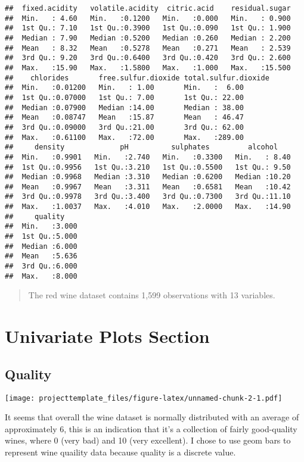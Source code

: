 \documentclass[]{article}
\begin{document}
\begin{verbatim}
##  fixed.acidity   volatile.acidity  citric.acid    residual.sugar  
##  Min.   : 4.60   Min.   :0.1200   Min.   :0.000   Min.   : 0.900  
##  1st Qu.: 7.10   1st Qu.:0.3900   1st Qu.:0.090   1st Qu.: 1.900  
##  Median : 7.90   Median :0.5200   Median :0.260   Median : 2.200  
##  Mean   : 8.32   Mean   :0.5278   Mean   :0.271   Mean   : 2.539  
##  3rd Qu.: 9.20   3rd Qu.:0.6400   3rd Qu.:0.420   3rd Qu.: 2.600  
##  Max.   :15.90   Max.   :1.5800   Max.   :1.000   Max.   :15.500  
##    chlorides       free.sulfur.dioxide total.sulfur.dioxide
##  Min.   :0.01200   Min.   : 1.00       Min.   :  6.00      
##  1st Qu.:0.07000   1st Qu.: 7.00       1st Qu.: 22.00      
##  Median :0.07900   Median :14.00       Median : 38.00      
##  Mean   :0.08747   Mean   :15.87       Mean   : 46.47      
##  3rd Qu.:0.09000   3rd Qu.:21.00       3rd Qu.: 62.00      
##  Max.   :0.61100   Max.   :72.00       Max.   :289.00      
##     density             pH          sulphates         alcohol     
##  Min.   :0.9901   Min.   :2.740   Min.   :0.3300   Min.   : 8.40  
##  1st Qu.:0.9956   1st Qu.:3.210   1st Qu.:0.5500   1st Qu.: 9.50  
##  Median :0.9968   Median :3.310   Median :0.6200   Median :10.20  
##  Mean   :0.9967   Mean   :3.311   Mean   :0.6581   Mean   :10.42  
##  3rd Qu.:0.9978   3rd Qu.:3.400   3rd Qu.:0.7300   3rd Qu.:11.10  
##  Max.   :1.0037   Max.   :4.010   Max.   :2.0000   Max.   :14.90  
##     quality     
##  Min.   :3.000  
##  1st Qu.:5.000  
##  Median :6.000  
##  Mean   :5.636  
##  3rd Qu.:6.000  
##  Max.   :8.000
\end{verbatim}

\begin{quote}
The red wine dataset contains 1,599 observations with 13 variables.
\end{quote}

\section{Univariate Plots Section}\label{univariate-plots-section}

\subsection{Quality}\label{quality}

\texttt{[image: projecttemplate\_files/figure-latex/unnamed-chunk-2-1.pdf]}

It seems that overall the wine dataset is normally distributed with an
average of approximately 6, this is an indication that it's a collection
of fairly good-quality wines, where 0 (very bad) and 10 (very
excellent). I chose to use geom bars to represent wine quaility data
because quality is a discrete value.
\end{document}
